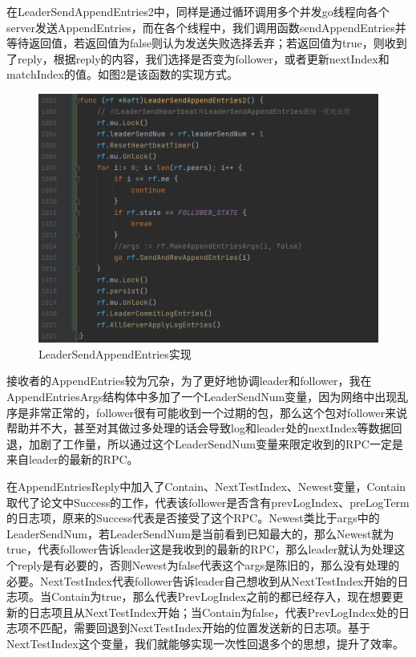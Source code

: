 \documentclass[UTF8]{article}
\begin{document}
在LeaderSendAppendEntries2中，同样是通过循环调用多个并发go线程向各个server发送AppendEntries，而在各个线程中，我们调用函数sendAppendEntries并等待返回值，若返回值为false则认为发送失败选择丢弃；若返回值为true，则收到了reply，根据reply的内容，我们选择是否变为follower，或者更新nextIndex和matchIndex的值。如图2是该函数的实现方式。

\begin{figure}[h]
  \centering
  \includegraphics[scale=0.3]{pic3.png}
  \caption{LeaderSendAppendEntries实现}
\end{figure}

接收者的AppendEntries较为冗杂，为了更好地协调leader和follower，我在AppendEntriesArgs结构体中多加了一个LeaderSendNum变量，因为网络中出现乱序是非常正常的，follower很有可能收到一个过期的包，那么这个包对follower来说帮助并不大，甚至对其做过多处理的话会导致log和leader处的nextIndex等数据回退，加剧了工作量，所以通过这个LeaderSendNum变量来限定收到的RPC一定是来自leader的最新的RPC。

在AppendEntriesReply中加入了Contain、NextTestIndex、Newest变量，Contain取代了论文中Success的工作，代表该follower是否含有prevLogIndex、preLogTerm的日志项，原来的Success代表是否接受了这个RPC。Newest类比于args中的LeaderSendNum，若LeaderSendNum是当前看到已知最大的，那么Newest就为true，代表follower告诉leader这是我收到的最新的RPC，那么leader就认为处理这个reply是有必要的，否则Newest为false代表这个args是陈旧的，那么没有处理的必要。NextTestIndex代表follower告诉leader自己想收到从NextTestIndex开始的日志项。当Contain为true，那么代表PrevLogIndex之前的都已经存入，现在想要更新的日志项且从NextTestIndex开始；当Contain为false，代表PrevLogIndex处的日志项不匹配，需要回退到NextTestIndex开始的位置发送新的日志项。基于NextTestIndex这个变量，我们就能够实现一次性回退多个的思想，提升了效率。
\end{document}

